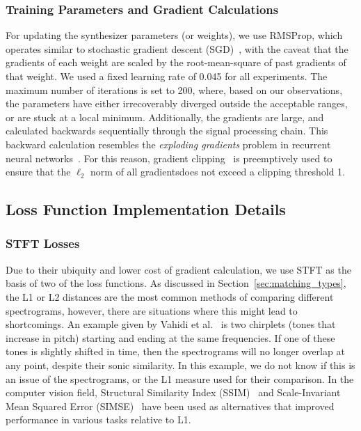 \documentclass[lettersize,journal]{IEEEtran}
\begin{document}
\subsubsection{Training Parameters and Gradient Calculations}
 For updating the synthesizer parameters (or weights), we use RMSProp, which operates similar to stochastic gradient descent (SGD)~\cite{goodfellow2016deep}, with the caveat that the gradients of each weight are scaled by the root-mean-square of past gradients of that weight. We used a fixed learning rate of 0.045 for all experiments. The maximum number of iterations is set to 200, where, based on our observations, the parameters have either irrecoverably diverged outside the acceptable ranges, or are stuck at a local minimum. Additionally, the gradients are large, and calculated backwards sequentially through the signal processing chain. This backward calculation resembles the \textit{exploding gradients} problem in recurrent neural networks~\cite{gers2000learning}. For this reason, gradient clipping~\cite{goodfellow2016deep} is preemptively used to ensure that the  $\ell_2$ norm of all gradientsdoes not exceed a clipping threshold 1. 


\subsection{Loss Function Implementation Details}
\label{sec:loss_implementation}
\subsubsection{STFT Losses}
Due to their ubiquity and lower cost of gradient calculation, we use STFT as the basis of two of the loss functions. As discussed in Section~\ref{sec:matching_types}, the L1 or L2 distances are the most common methods of comparing different spectrograms, however, there are situations where this might lead to shortcomings. An example given by Vahidi et  al.~\cite{vahidi2023mesostructures} is two chirplets (tones that increase in pitch) starting and ending at the same frequencies. If one of these tones is slightly shifted in time, then the spectrograms will no longer overlap at any point, despite their sonic similarity. In this example, we do not know if this is an issue of the spectrograms, or the L1 measure used for their comparison. In the computer vision field, Structural Similarity Index (SSIM)~\cite{wang2004imagesssim,wang2009mean} and Scale-Invariant Mean Squared Error (SIMSE)~\cite{barron2014shapessimse} have been used as alternatives that improved performance in various tasks relative to L1.
\end{document}
